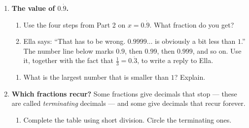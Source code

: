 \documentclass[12pt,a4paper]{article}
\begin{document}
\begin{enumerate}[resume]

\item \textbf{The value of $0.\dot{9}$.}
\begin{enumerate}
  \item Use the four steps from Part 2 on $x=0.\dot{9}$. What fraction do
        you get?

        \vspace{12em}
  \item Ella says: ``That has to be wrong. $0.9999\ldots$ is obviously a bit
        less than $1$.'' The number line below marks $0.9$, then $0.99$, then
        $0.999$, and so on. Use it, together with the fact that
        $\frac{1}{3}=0.\dot{3}$, to write a reply to Ella.
\end{enumerate}

\vspace{4pt}
\begin{center}
\end{center}
\vspace{4pt}

\begin{enumerate}[resume]
  \item What is the largest number that is smaller than $1$? Explain.

        \vspace{14em}
\end{enumerate}

\newpage

\item \textbf{Which fractions recur?} Some fractions give decimals that stop
--- these are called \emph{terminating} decimals --- and some give decimals
that recur forever.
\begin{enumerate}
  \item Complete the table using short division. Circle the terminating ones.


\end{enumerate}
\end{enumerate}
\end{document}
